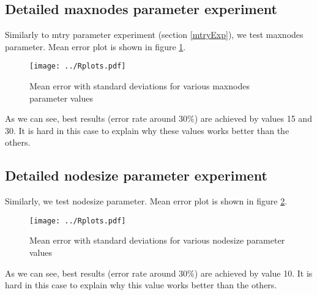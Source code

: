 \documentclass[a4paper]{article}
\begin{document}
\subsection{Detailed maxnodes parameter experiment}

Similarly to mtry parameter experiment (section \ref{mtryExp}), we test maxnodes parameter.
Mean error plot is shown in figure \ref{fig:detailedMaxnodes}.

\begin{figure}[!hbt]
    \centering
    \texttt{[image: ../Rplots.pdf]}
    \caption[]{Mean error with standard deviations for various maxnodes parameter values
    \label{fig:detailedMaxnodes}
    }
\end{figure}

As we can see, best results (error rate around 30\%) are achieved by values 15 and 30.
It is hard in this case to explain why these values works better than the others.

\subsection{Detailed nodesize parameter experiment}

Similarly, we test nodesize parameter.
Mean error plot is shown in figure \ref{fig:detailedNodesize}.

\begin{figure}[!hbt]
    \centering
    \texttt{[image: ../Rplots.pdf]}
    \caption[]{Mean error with standard deviations for various nodesize parameter values
    \label{fig:detailedNodesize}
    }
\end{figure}

As we can see, best results (error rate around 30\%) are achieved by value 10.
It is hard in this case to explain why this value works better than the others.


% 
% 
\end{document}
